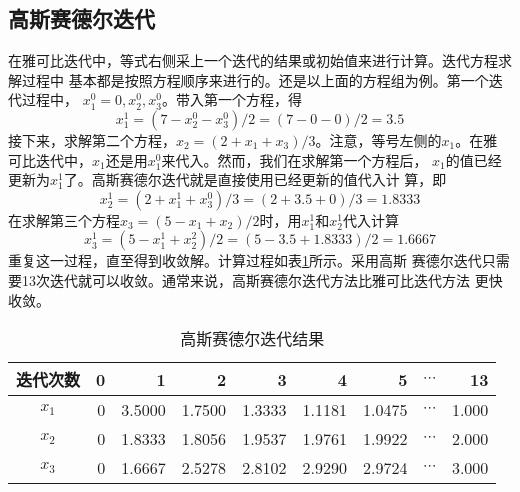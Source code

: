 \subsection{高斯赛德尔迭代}
在雅可比迭代中，等式右侧采上一个迭代的结果或初始值来进行计算。迭代方程求解过程中
基本都是按照方程顺序来进行的。还是以上面的方程组为例。第一个迭代过程中，
$x_{1}^{0}=0,x_{2}^{0},x_{3}^{0}$。带入第一个方程，得
\begin{equation}
  x_{1}^{1} = (7-x_{2}^{0}-x_{3}^{0})/2 = (7-0-0)/2=3.5
\end{equation}
接下来，求解第二个方程，$x_{2}=(2+x_{1}+x_{3})/3$。注意，等号左侧的$x_{1}$。在雅
可比迭代中，$x_{1}$还是用$x_{1}^{0}$来代入。然而，我们在求解第一个方程后，
$x_{1}$的值已经更新为$x_{1}^{1}$了。高斯赛德尔迭代就是直接使用已经更新的值代入计
算，即
\begin{equation}
  x_{2}^{1} = (2+x_{1}^{1}+x_{3}^{0})/3=(2+3.5+0)/3 = 1.8333
\end{equation}
在求解第三个方程$x_{3}=(5-x_{1}+x_{2})/2$时，用$x_{1}^{1}$和$x_{2}^{1}$代入计算
\begin{equation}
  x_{3}^{1} = (5-x_{1}^{1}+x_{2}^{2})/2=(5-3.5+1.8333)/2=1.6667
\end{equation}
重复这一过程，直至得到收敛解。计算过程如表\ref{TbLA_Gauss_result}所示。采用高斯
赛德尔迭代只需要13次迭代就可以收敛。通常来说，高斯赛德尔迭代方法比雅可比迭代方法
更快收敛。
\begin{table}[h!]
  \begin{center}
  \caption{高斯赛德尔迭代结果}
  \label{TbLA_Gauss_result}
  \begin{tabular}{|c|r|r|r|r|r|r|r|r|}
    \hline
    迭代次数 & 0 & 1 & 2 & 3 & 4 & 5 & $\cdots$ & 13 \\
    \hline
    $x_{1}$ & 0 & 3.5000 & 1.7500 & 1.3333 & 1.1181 & 1.0475 & $\cdots$ & 1.000
    \\
    \hline
    $x_{2}$ & 0 & 1.8333 & 1.8056 & 1.9537 & 1.9761 & 1.9922 & $\cdots$ & 2.000
    \\
    \hline
    $x_{3}$ & 0 & 1.6667 & 2.5278 & 2.8102 & 2.9290 & 2.9724 & $\cdots$ & 3.000
    \\
    \hline
  \end{tabular}
  \end{center}
\end{table}

